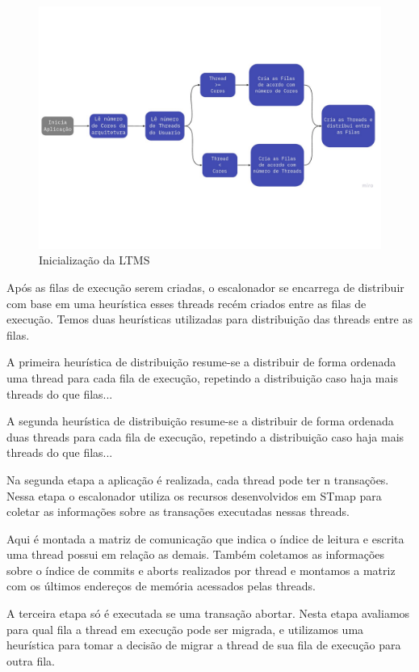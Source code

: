 \documentclass[diss,capa]{texufpel}
\begin{document}
\begin{figure}[htbp]
  \centering \includegraphics[scale=.5]{images/lstm1}
\caption{Inicialização da LTMS} 
\label{LTMS1}
\end{figure}

Após as filas de execução serem criadas, o escalonador se encarrega de distribuir com base em uma heurística esses threads recém criados entre as filas de execução. Temos duas heurísticas utilizadas para distribuição das threads entre as filas.

A primeira heurística de distribuição resume-se a distribuir de forma ordenada uma thread para cada fila de execução, repetindo a distribuição caso haja mais threads do que filas...

A segunda heurística de distribuição resume-se a distribuir de forma ordenada duas threads para cada fila de execução, repetindo a distribuição caso haja mais threads do que filas...

Na segunda etapa a aplicação é realizada, cada thread pode ter n transações. Nessa etapa o escalonador utiliza os recursos desenvolvidos em STmap para coletar as informações sobre as transações executadas nessas threads.

Aqui é montada a matriz de comunicação que indica o índice de leitura e escrita uma thread possui em relação as demais. Também coletamos as informações sobre o índice de commits e aborts realizados por thread e montamos a matriz com os últimos endereços de memória acessados pelas threads.

A terceira etapa só é executada se uma transação abortar. Nesta etapa avaliamos para qual fila a thread em execução pode ser migrada, e utilizamos uma heurística para tomar a decisão de migrar a thread de sua fila de execução para outra fila.
\end{document}
